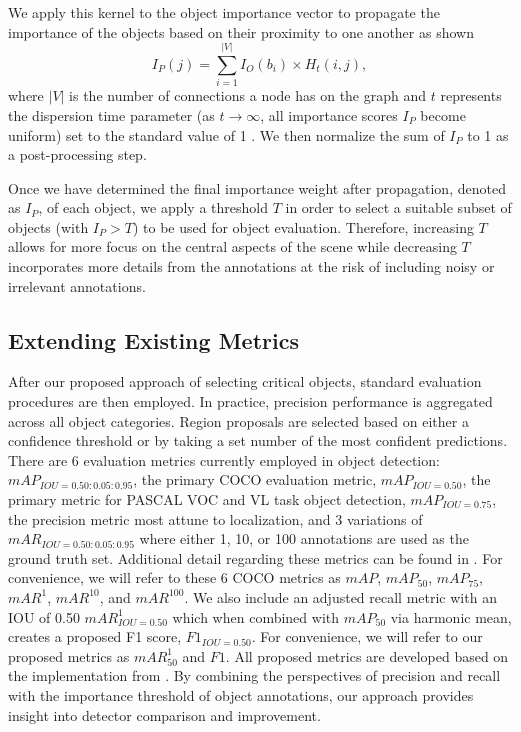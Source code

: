 \documentclass[10pt,twocolumn,letterpaper]{article}
\begin{document}
We apply this kernel to the object importance vector to propagate the importance of the objects based on their proximity to one another as shown
\begin{equation}
I_{P}(j)=\sum_{i=1}^{|V|} 
I_{O}(b_i) \times H_{t}(i,j),
\end{equation}
where $|V|$ is the number of connections a node has on the graph and $t$ represents the dispersion time parameter (as $t \! \! \rightarrow \! \! \infty$, all importance scores $I_P$ become uniform) set to the standard value of 1 \cite{gsp2017}. We then normalize the sum of $I_{P}$ to 1 as a post-processing step.
\par
Once we have determined the final importance weight after propagation, denoted as $I_P$, of each object, we apply a threshold $T$ in order to select a suitable subset of objects (with $I_P > T$) to be used for object evaluation. Therefore, increasing $T$ allows for more focus on the central aspects of the scene while decreasing $T$ incorporates more details from the annotations at the risk of including noisy or irrelevant annotations.
\subsection{Extending Existing Metrics}
  After our proposed approach of selecting critical objects, standard evaluation procedures are then employed. In practice, precision performance is aggregated across all object categories. Region proposals are selected based on either a confidence threshold or by taking a set number of the most confident predictions. There are 6 evaluation metrics currently employed in object detection: $mAP_{IOU=0.50:0.05:0.95}$, the primary COCO evaluation metric, $mAP_{IOU=0.50}$, the primary metric for PASCAL VOC and VL task object detection, $mAP_{IOU=0.75}$, the precision metric most attune to localization, and 3 variations of $mAR_{IOU=0.50:0.05:0.95}$ where either 1, 10, or 100 annotations are used as the ground truth set. Additional detail regarding these metrics can be found in \cite{evalsurvey2020}. For convenience, we will refer to these 6 COCO metrics as $mAP$, $mAP_{50}$, $mAP_{75}$, $mAR^{1}$, $mAR^{10}$, and $mAR^{100}$. We also include an adjusted recall metric with an IOU of 0.50 $mAR_{IOU=0.50}^{1}$ which when combined with $mAP_{50}$ via harmonic mean, creates a proposed F1 score, $F1_{IOU=0.50}$. For convenience, we will refer to our proposed metrics as $mAR_{50}^1$ and $F1$. All proposed metrics are developed based on the implementation from \cite{coco2014}. By combining the perspectives of precision and recall with the importance threshold of object annotations, our approach provides  insight into detector comparison and improvement.
\end{document}
